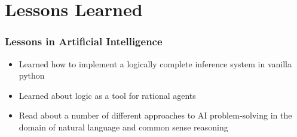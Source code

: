 \section{Lessons Learned}

\begin{frame}
    \frametitle{Lessons in Artificial Intelligence}

    \begin{itemize}
        \item Learned how to implement a logically complete inference
            system in vanilla python
        \item Learned about logic as a tool for rational agents
        \item Read about a number of different approaches to AI
            problem-solving in the domain of natural language and common
            sense reasoning
    \end{itemize}
\end{frame}

